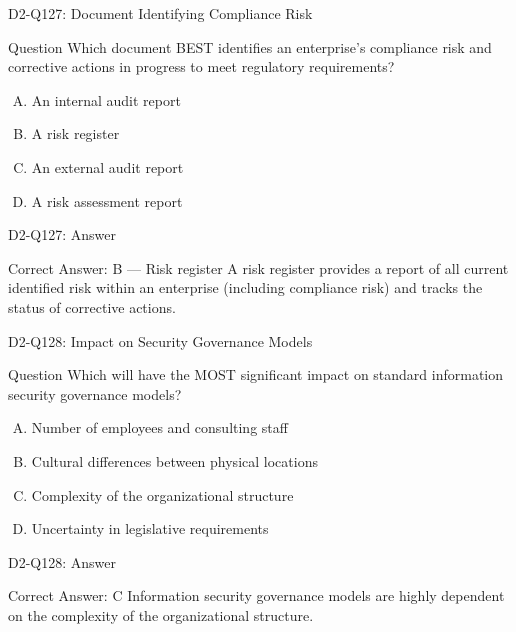 \documentclass{beamer}
\begin{document}
	\begin{frame}{D2-Q127: Document Identifying Compliance Risk}
		\begin{block}{Question}
			Which document BEST identifies an enterprise's compliance risk and corrective actions in progress to meet regulatory requirements?
		\end{block}
		\begin{enumerate}[(A)]
			\item An internal audit report
			\item A risk register
			\item An external audit report
			\item A risk assessment report
		\end{enumerate}
	\end{frame}
	\begin{frame}{D2-Q127: Answer}
		\begin{block}{Correct Answer: B --- Risk register}
			A risk register provides a report of all current identified risk within an enterprise (including compliance risk) and tracks the status of corrective actions.
		\end{block}
	\end{frame}
	
	\begin{frame}{D2-Q128: Impact on Security Governance Models}
		\begin{block}{Question}
			Which will have the MOST significant impact on standard information security governance models?
		\end{block}
		\begin{enumerate}[(A)]
			\item Number of employees and consulting staff
			\item Cultural differences between physical locations
			\item Complexity of the organizational structure
			\item Uncertainty in legislative requirements
		\end{enumerate}
	\end{frame}
	\begin{frame}{D2-Q128: Answer}
		\begin{block}{Correct Answer: C}
			Information security governance models are highly dependent on the complexity of the organizational structure.
		\end{block}
	\end{frame}
	
\end{document}
